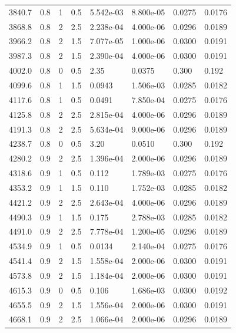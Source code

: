 \documentclass[preview]{standalone}
\begin{document}
{{{\begin{tabular}{L{1.2cm}C{1.2cm} C{0.3cm}C{0.5cm} C{1.4cm}C{1.4cm} C{1.4cm}C{1.4cm}}
  3840.7  &   0.8  & 1     & 0.5 &  5.542e-03  & 8.800e-05  & 0.0275 &  0.0176   \\ 
  3868.8  &   0.8  & 2     & 2.5 &  2.238e-04  & 4.000e-06  & 0.0296 &  0.0189   \\ 
  3966.2  &   0.8  & 2     & 1.5 &  7.077e-05  & 1.000e-06  & 0.0300 &  0.0191   \\ 
  3987.3  &   0.8  & 2     & 1.5 &  2.390e-04  & 4.000e-06  & 0.0300 &  0.0191   \\ 
  4002.0  &   0.8  & 0     & 0.5 &  2.35  & 0.0375  & 0.300 &  0.192   \\ 
  4099.6  &   0.8  & 1     & 1.5 &  0.0943  & 1.506e-03  & 0.0285 &  0.0182   \\ 
  4117.6  &   0.8  & 1     & 0.5 &  0.0491  & 7.850e-04  & 0.0275 &  0.0176   \\ 
  4125.8  &   0.8  & 2     & 2.5 &  2.815e-04  & 4.000e-06  & 0.0296 &  0.0189   \\ 
  4191.3  &   0.8  & 2     & 2.5 &  5.634e-04  & 9.000e-06  & 0.0296 &  0.0189   \\ 
  4238.7  &   0.8  & 0     & 0.5 &  3.20  & 0.0510  & 0.300 &  0.192   \\ 
  4280.2  &   0.9  & 2     & 2.5 &  1.396e-04  & 2.000e-06  & 0.0296 &  0.0189   \\ 
  4318.6  &   0.9  & 1     & 0.5 &  0.112  & 1.789e-03  & 0.0275 &  0.0176   \\ 
  4353.2  &   0.9  & 1     & 1.5 &  0.110  & 1.752e-03  & 0.0285 &  0.0182   \\ 
  4421.2  &   0.9  & 2     & 2.5 &  2.643e-04  & 4.000e-06  & 0.0296 &  0.0189   \\ 
  4490.3  &   0.9  & 1     & 1.5 &  0.175  & 2.788e-03  & 0.0285 &  0.0182   \\ 
  4491.0  &   0.9  & 2     & 2.5 &  7.778e-04  & 1.200e-05  & 0.0296 &  0.0189   \\ 
  4534.9  &   0.9  & 1     & 0.5 &  0.0134  & 2.140e-04  & 0.0275 &  0.0176   \\ 
  4541.4  &   0.9  & 2     & 1.5 &  1.558e-04  & 2.000e-06  & 0.0300 &  0.0191   \\ 
  4573.8  &   0.9  & 2     & 1.5 &  1.184e-04  & 2.000e-06  & 0.0300 &  0.0191   \\ 
  4615.3  &   0.9  & 0     & 0.5 &  0.106  & 1.686e-03  & 0.0300 &  0.0192   \\ 
  4655.5  &   0.9  & 2     & 1.5 &  1.556e-04  & 2.000e-06  & 0.0300 &  0.0191   \\ 
  4668.1  &   0.9  & 2     & 2.5 &  1.066e-04  & 2.000e-06  & 0.0296 &  0.0189   \\ 

\end{tabular}}}}
\end{document}
